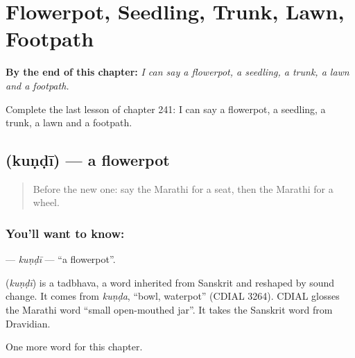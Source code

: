 
\chapter{Flowerpot, Seedling, Trunk, Lawn, Footpath}
\label{ch:mr-flowerpot-seedling-trunk-lawn-footpath}

\begin{chapteropening}
\textbf{By the end of this chapter:} \emph{I can say a flowerpot, a seedling, a trunk, a lawn and a footpath.}

Complete the last lesson of chapter 241: I can say a flowerpot, a seedling, a trunk, a lawn and a footpath.
\end{chapteropening}

\section[\texorpdfstring{\mr{कुंडी} (kuṇḍī)}{कुंडी (kuṇḍī)}]{ (kuṇḍī) — a flowerpot}

\label{lesson:MR-C241-kundi}



\begin{quote}
Before the new one: say the Marathi for a seat, then the Marathi for a wheel.
\end{quote}

\subsection*{You'll want to know: }
\textbf{} — \emph{kuṇḍī} — \textquotedblleft{}a flowerpot\textquotedblright{}.

\begin{cousinweb}
\textbf{} (\emph{kuṇḍī}) is a tadbhava, a word inherited from Sanskrit and reshaped by sound change. It comes from \emph{kuṇḍa}, \textquotedblleft{}bowl, waterpot\textquotedblright{} (CDIAL 3264). CDIAL glosses the Marathi word \textquotedblleft{}small open-mouthed jar\textquotedblright{}. It takes the Sanskrit word from Dravidian.
\end{cousinweb}

\begin{grammarlens}[title={What you've built}]
One more word for this chapter.
\end{grammarlens}

